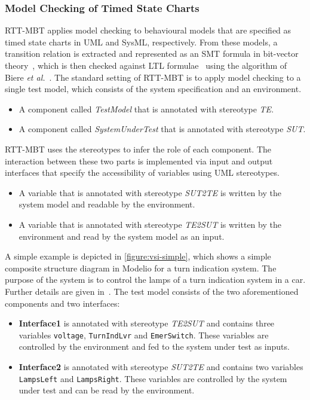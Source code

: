 \subsubsection{Model Checking of Timed State Charts}
\label{appendix:rtt-model-checking}
RTT-MBT applies model checking to behavioural models that are specified as timed state charts in UML and SysML, respectively.
%
From these models, a transition relation is extracted and represented as an SMT formula in bit-vector theory~\cite{Kroening&08}, which is then checked against LTL formulae~\cite{Pnueli77} using the algorithm of Biere \emph{et al.\@}~\cite{Biere&06}.
%
The standard setting of RTT-MBT is to apply model checking to a single test model, which consists of the system specification and an environment.
%
%
%
\begin{itemize}
%
\item A component called \emph{TestModel} that is annotated with stereotype \emph{TE}.
%
\item A component called \emph{SystemUnderTest} that is annotated with stereotype \emph{SUT}.
%
\end{itemize}
%
%
%
RTT-MBT uses the stereotypes to infer the role of each component.
%
The interaction between these two parts is implemented via input and output interfaces that specify the accessibility of variables using UML stereotypes.
%
%
%
\begin{itemize}
%
\item A variable that is annotated with stereotype \emph{SUT2TE} is written by the system model and readable by the environment.
%
\item A variable that is annotated with stereotype \emph{TE2SUT} is written by the environment and read by the system model as an input.
%
\end{itemize}
%
%
%
A simple example is depicted in \autoref{figure:vsi-simple}, which shows a simple composite structure diagram in Modelio for a turn indication system.
%
The purpose of the system is to control the lamps of a turn indication system in a car.
%
Further details are given in~\cite{rttmbtmanual}.
%
The test model consists of the two aforementioned components and two interfaces:
%
%
%
\begin{itemize}
%
\item {\bf Interface1} is annotated with stereotype \emph{TE2SUT} and contains three variables {\tt voltage}, {\tt TurnIndLvr} and {\tt EmerSwitch}. These variables are controlled by the environment and fed to the system under test as inputs.
%
\item {\bf Interface2} is annotated with stereotype \emph{SUT2TE} and contains two variables {\tt LampsLeft} and {\tt LampsRight}. These variables are controlled by the system under test and can be read by the environment.
%
\end{itemize}
